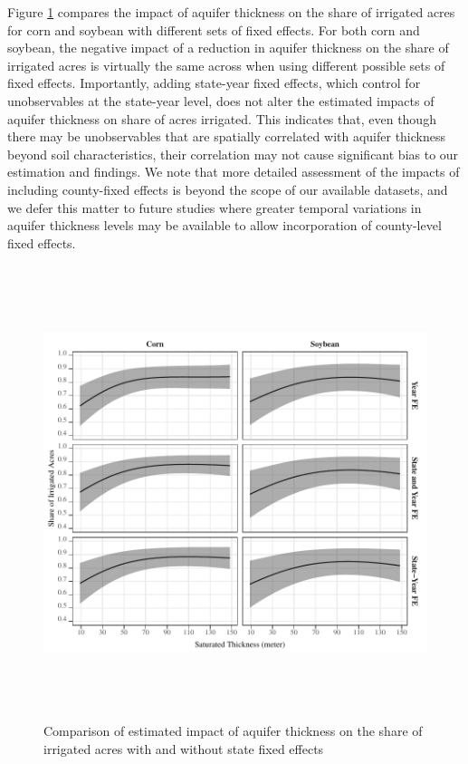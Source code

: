 \documentclass[
]{article}
\begin{document}
Figure \ref{fig:state-fe-with-without} compares the impact of aquifer thickness on the share of irrigated acres for corn and soybean with different sets of fixed effects. For both corn and soybean, the negative impact of a reduction in aquifer thickness on the share of irrigated acres is virtually the same across when using different possible sets of fixed effects. Importantly, adding state-year fixed effects, which control for unobservables at the state-year level, does not alter the estimated impacts of aquifer thickness on share of acres irrigated. This indicates that, even though there may be unobservables that are spatially correlated with aquifer thickness beyond soil characteristics, their correlation may not cause significant bias to our estimation and findings. We note that more detailed assessment of the impacts of including county-fixed effects is beyond the scope of our available datasets, and we defer this matter to future studies where greater temporal variations in aquifer thickness levels may be available to allow incorporation of county-level fixed effects.

\begin{figure}[H]

{\centering \includegraphics[width=6in,height=500px,]{../../Figures/g_share_comp} 

}

\caption{Comparison of estimated impact of aquifer thickness on the share of irrigated acres with and without state fixed effects}\label{fig:state-fe-with-without}
\end{figure}
\end{document}
